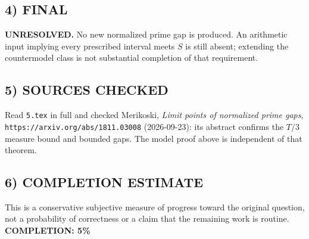 \subsection{4) FINAL}
\textbf{UNRESOLVED.}
No new normalized prime gap is produced. An arithmetic input implying every prescribed interval meets $S$ is still absent; extending the countermodel class is not substantial completion of that requirement.
\subsection{5) SOURCES CHECKED}
Read \texttt{5.tex} in full and checked Merikoski, \emph{Limit points of normalized prime gaps}, \texttt{https://arxiv.org/abs/1811.03008} (2026-09-23): its abstract confirms the $T/3$ measure bound and bounded gaps. The model proof above is independent of that theorem.
\subsection{6) COMPLETION ESTIMATE}
This is a conservative subjective measure of progress toward the original question, not a probability of correctness or a claim that the remaining work is routine.
\textbf{COMPLETION: 5\%}
